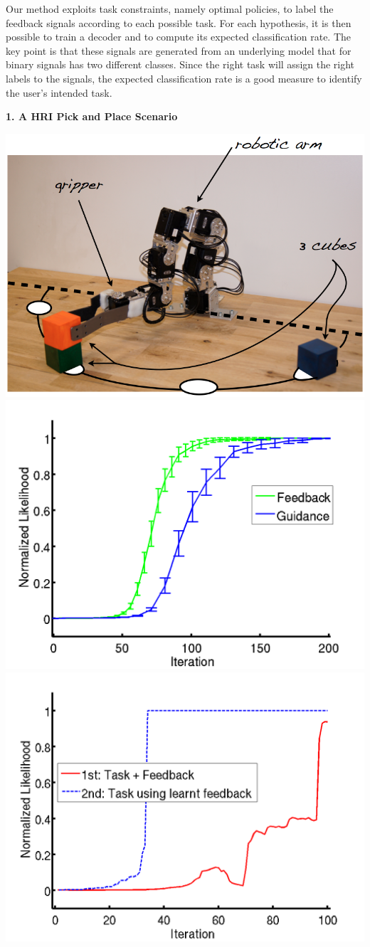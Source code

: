 \documentclass[a0,final, portrait]{inriaposter}
\begin{document}
\begin{multicols}{2}
{Our method exploits task constraints, namely optimal policies, to label the feedback signals according to each possible task. For each hypothesis, it is then possible to train a decoder and to compute its expected classification rate. The key point is that these signals are generated from an underlying model that for binary signals has two different classes. Since the right task will assign the right labels to the signals, the expected classification rate is a good measure to identify the user's intended task. 
}

{
	\begin{center}
		\textbf{1. A HRI Pick and Place Scenario}
		\vspace{0.5cm}
		
		\includegraphics[width=0.3\columnwidth]{images/setup4.png}
		\includegraphics[width=0.3\columnwidth]{images/011}
		\includegraphics[width=0.3\columnwidth]{images/real}

		\vspace{2cm}


\end{center}}
\end{multicols}
\end{document}
